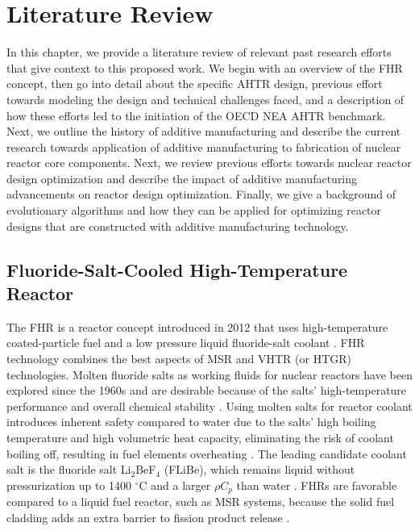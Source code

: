 \chapter{Literature Review}

In this chapter, we provide a literature review of relevant past research 
efforts that give context to this proposed work. 
We begin with an overview of the \gls{FHR} concept, then go into detail about 
the specific \gls{AHTR} design, previous effort towards modeling the design and 
technical challenges faced, and a description of how these efforts led to the 
initiation of the \gls{OECD} \gls{NEA} \gls{AHTR} benchmark.  
Next, we outline the history of additive manufacturing and describe the current 
research towards application of additive manufacturing to fabrication of 
nuclear reactor core components. 
Next, we review previous efforts towards nuclear reactor design optimization 
and describe the impact of additive manufacturing advancements on reactor 
design optimization. 
Finally, we give a background of evolutionary algorithms and how they can be 
applied for optimizing reactor designs that are constructed with additive 
manufacturing technology.

\section{Fluoride-Salt-Cooled High-Temperature Reactor}
The \gls{FHR} is a reactor concept introduced in 2012 that uses high-temperature 
coated-particle fuel and a low pressure liquid fluoride-salt coolant 
\cite{forsberg_fluoride-salt-cooled_2012,facilitators_fluoride-salt-cooled_2013}.
\gls{FHR} technology combines the best aspects of \gls{MSR} and \gls{VHTR} 
(or \gls{HTGR}) technologies. 
Molten fluoride salts as working fluids for nuclear reactors have been explored 
since the 1960s and are desirable because of the salts' high-temperature 
performance and overall chemical stability \cite{scarlat_design_2014}.  
Using molten salts for reactor coolant introduces inherent safety compared 
to water due to the salts' high boiling temperature and high volumetric 
heat capacity, eliminating the risk of coolant boiling off, resulting in 
fuel elements overheating \cite{ho_molten_2013}. 
The leading candidate coolant salt is the fluoride salt Li$_2$BeF$_4$ (FLiBe), 
which remains liquid without pressurization up to 1400 $^{\circ}$C and a larger 
$\rho C_p$ than water \cite{ho_molten_2013,forsberg_fluoride-salt-cooled_2012}. 
\glspl{FHR} are favorable compared to a liquid fuel reactor, such as
\gls{MSR} systems, because the solid fuel cladding adds an extra barrier to fission 
product release 
\cite{ho_molten_2013}.

